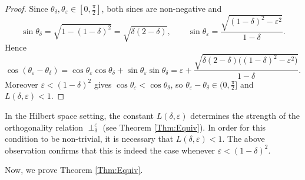 \documentclass[11pt, reqno]{amsart}
\theoremstyle{definition}
\newcommand{\nperp}{\perp_{\delta}^\varepsilon}
\begin{document}
\begin{proof}
Since $\theta_\delta,\theta_\varepsilon\in[0,\frac{\pi}{2}]$, both sines are non-negative
and
\[
\sin\theta_\delta = \sqrt{1-(1-\delta)^2} = \sqrt{\delta(2-\delta)},\qquad
\sin\theta_\varepsilon = \frac{\sqrt{(1-\delta)^2-\varepsilon^2}}{1-\delta}.
\]
Hence
\[
\cos(\theta_\varepsilon-\theta_\delta)
= \cos\theta_\varepsilon\cos\theta_\delta + \sin\theta_\varepsilon\sin\theta_\delta
= \varepsilon + \frac{\sqrt{\delta(2-\delta)\bigl((1-\delta)^2-\varepsilon^2\bigr)}}{1-\delta}.
\]
Moreover $\varepsilon<(1-\delta)^2$ gives $\cos\theta_\varepsilon<\cos\theta_\delta$, so
$\theta_\varepsilon-\theta_\delta\in(0,\frac{\pi}{2}]$ and $L(\delta,\varepsilon)<1$.
\end{proof}



\noindent In the Hilbert space setting, the constant $L(\delta,\varepsilon)$ determines the strength of the orthogonality relation $\nperp$ (see Theorem \ref{Thm:Equiv}). In order for this condition to be non-trivial, it is necessary that $L(\delta,\varepsilon) < 1$. The above observation confirms that this is indeed the case whenever $\varepsilon < (1-\delta)^2$.

\medskip


\noindent Now, we prove Theorem \ref{Thm:Equiv}.
\end{document}
